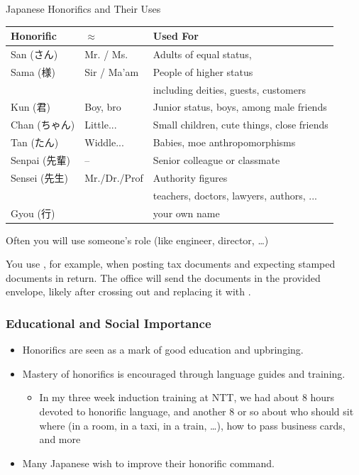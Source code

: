 \documentclass[xetex]{beamer}
\newcommand{\jpn}{\mtciteform}
\begin{document}
\begin{frame}{Japanese Honorifics and Their Uses}
  \begin{tabular}{lll}
\textbf{Honorific} & \textbf{$\approx$} & \textbf{Used For} \\
\hline
San (\textjapanese{さん}) & Mr. / Ms. & Adults of equal status, \\

    Sama (\textjapanese{様}) & Sir / Ma'am & People of higher status \\
     & & including deities, guests, customers \\

Kun (\textjapanese{君}) & Boy, bro & Junior status, boys, among male friends \\

Chan (\textjapanese{ちゃん}) & Little... & Small children, cute things,  close friends \\

Tan (\textjapanese{たん}) & Widdle... & Babies, moe anthropomorphisms \\

Senpai (\textjapanese{先輩}) & – & Senior colleague or classmate \\

    Sensei (\textjapanese{先生}) & Mr./Dr./Prof & Authority figures \\

                    & & teachers, doctors, lawyers, authors, ... \\
Gyou  (\textjapanese{行}) &  & your own name\\
  \end{tabular}

  Often you will use someone's role (like engineer, director, \ldots)

 You use \jpn{gyou}, for example, when posting tax documents and expecting stamped documents in return. The office will send the documents in the provided envelope, likely after crossing out \jpn{gyou} and replacing it with \jpn{sama}.


  
\end{frame}

\begin{frame}
\frametitle{Educational and Social Importance}
\begin{itemize}
    \item Honorifics are seen as a mark of good education and upbringing.
    \item Mastery of honorifics is encouraged through language guides and training.
      \begin{itemize}
      \item In my three week induction training at NTT, we had about 8
        hours devoted to honorific language, and another 8 or so about
        who should sit where (in a room, in a taxi, in a train,
        \ldots), how to pass business cards, and more
      \end{itemize}
    \item Many Japanese wish to improve their honorific command.
\end{itemize}
\end{frame}
\end{document}
